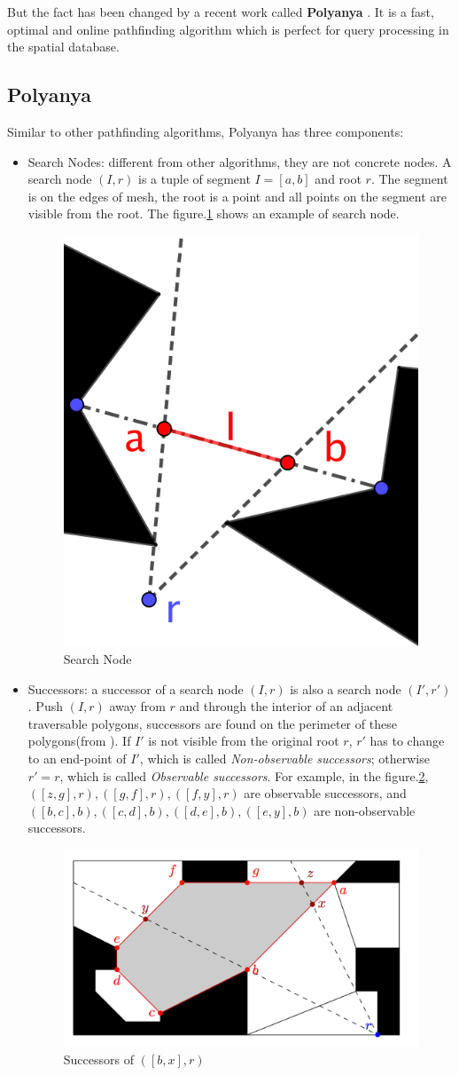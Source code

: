 But the fact has been changed by a recent work called \textbf{Polyanya} \cite{cuicompromise}.
It is a fast, optimal and online pathfinding algorithm which is perfect for
query processing in the spatial database.

\subsection{Polyanya}\label{polyanya}

Similar to other pathfinding algorithms, Polyanya has three components:

\begin{itemize}

  \item Search Nodes: different from other algorithms, they are not concrete nodes. A search
    node $(I, r)$ is a tuple of segment $I=[a, b]$ and root $r$. The segment is on the edges of
    mesh, the root is a point and all points on the segment are visible from the root.
    The figure.\ref{snode} shows an example of search node.

   \begin{figure}[h]
     \centering
     \includegraphics[width=.2\linewidth]{pic/snode.png}
     \caption{Search Node}
     \label{snode}
   \end{figure}

  \item Successors: a successor of a search node $(I, r)$ is also a search node $(I', r')$.
  Push $(I, r)$ away from $r$ and through the interior of an adjacent traversable polygons,
  successors are found on the perimeter of these polygons(from \cite{cuicompromise}).
  If $I'$ is not visible from the original root $r$, $r'$ has to change to an end-point of $I'$, which is called
  \textit{Non-observable successors}; otherwise $r'=r$, which is called \textit{Observable
  successors}. For example, in the figure.\ref{suc},  $([z,g],r), ([g,f],r), ([f,y],r)$
  are observable successors, and $([b,c],b),([c,d],b),([d,e],b),([e,y],b)$ are non-observable
  successors.

    \begin{figure}[h]
      \centering
      \includegraphics[width=.6\linewidth]{pic/suc.png}
      \caption{Successors of $([b,x],r)$}
      \label{suc}
    \end{figure}


\end{itemize}
